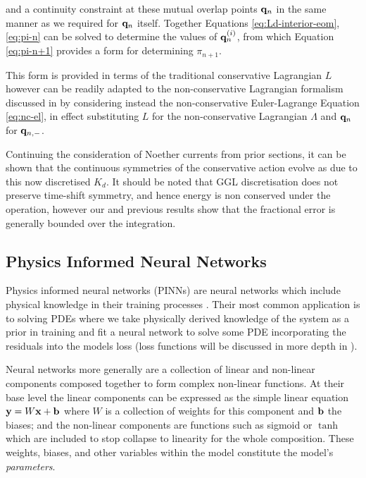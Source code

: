 and a continuity constraint at these mutual overlap points $\vb q_n$ in the same manner as we required for $\vb q_n$ itself. Together Equations \eqref{eq:Ld-interior-eom}, \eqref{eq:pi-n} can be solved to determine the values of $\vb q^{(i)}_n$, from which Equation \eqref{eq:pi-n+1} provides a form for determining $\pi_{n + 1}$.

This form is provided in terms of the traditional conservative Lagrangian $L$ however can be readily adapted to the non-conservative Lagrangian formalism discussed in  by considering instead the non-conservative Euler-Lagrange Equation \eqref{eq:nc-el}, in effect substituting $L$ for the non-conservative Lagrangian $\Lambda$ and $\vb q_n$ for $\vb q_{n, -}$.

Continuing the consideration of Noether currents from prior sections, it can be shown that the continuous symmetries of the conservative action evolve as due to this now discretised $K_d$. It should be noted that GGL discretisation does not preserve time-shift symmetry, and hence energy is non conserved under the operation, however our  and previous results show that the fractional error is generally bounded over the integration.

\subsection{Physics Informed Neural Networks}
\label{sec:intro-pinn}

Physics informed neural networks (PINNs) are neural networks which include physical knowledge in their training processes \cite{raissiPhysicsInformedDeep2017}. Their most common application is to solving PDEs \cite{luDeepXDEDeepLearning2021,mengCompositeNeuralNetwork2020} where we take physically derived knowledge of the system as a prior in training and fit a neural network to solve some PDE incorporating the residuals into the models loss (loss functions will be discussed in more depth in ).

Neural networks more generally are a collection of linear and non-linear components composed together to form complex non-linear functions. At their base level the linear components can be expressed as the simple linear equation \(\vb{y} = W\vb{x} + \vb{b}\) where $W$ is a collection of weights for this component and $\vb{b}$ the biases; and the non-linear components are functions such as sigmoid or $\tanh$ which are included to stop collapse to linearity for the whole composition. These weights, biases, and other variables within the model constitute the model's \emph{parameters}.

